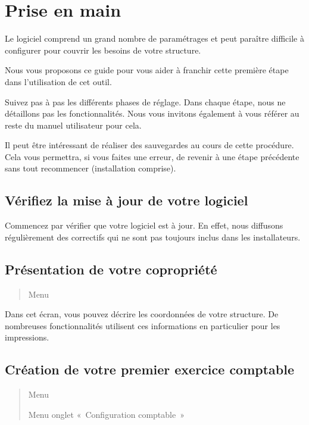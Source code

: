 \documentclass[a4paper,10pt,oneside,french]{sphinxmanual}
\begin{document}
\section{Prise en main}
\label{\detokenize{syndic/first_step:prise-en-main}}\label{\detokenize{syndic/first_step::doc}}
\sphinxAtStartPar
Le logiciel  comprend un grand nombre de paramétrages et peut paraître difficile à configurer pour couvrir les besoins de votre structure.

\sphinxAtStartPar
Nous vous proposons ce guide pour vous aider à franchir cette première étape dans l’utilisation de cet outil.

\sphinxAtStartPar
Suivez pas à pas les différents phases de réglage. Dans chaque étape, nous ne détaillons pas les fonctionnalités. Nous vous invitons également à vous référer au reste du manuel utilisateur pour cela.

\sphinxAtStartPar
Il peut être intéressant de réaliser des sauvegardes au cours de cette procédure.
Cela vous permettra, si vous faites une erreur, de revenir à une étape précédente sans tout recommencer (installation comprise).


\subsection{Vérifiez la mise à jour de votre logiciel}
\label{\detokenize{syndic/first_step:verifiez-la-mise-a-jour-de-votre-logiciel}}
\sphinxAtStartPar
Commencez par vérifier que votre logiciel est à jour.
En effet, nous diffusons régulièrement des correctifs qui ne sont pas toujours inclus dans les installateurs.


\subsection{Présentation de votre copropriété}
\label{\detokenize{syndic/first_step:presentation-de-votre-copropriete}}\begin{quote}

\sphinxAtStartPar
Menu 
\end{quote}

\sphinxAtStartPar
Dans cet écran, vous pouvez décrire les coordonnées de votre structure.
De nombreuses fonctionnalités utilisent ces informations en particulier pour les impressions.


\subsection{Création de votre premier exercice comptable}
\label{\detokenize{syndic/first_step:creation-de-votre-premier-exercice-comptable}}\begin{quote}

\sphinxAtStartPar
Menu 

\sphinxAtStartPar
Menu  \sphinxhyphen{} onglet « Configuration comptable »
\end{quote}
\end{document}
